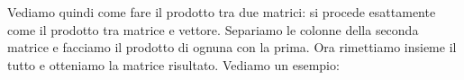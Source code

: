 \documentclass{article}     %
\begin{document}
Vediamo quindi come fare il prodotto tra due matrici: si procede esattamente come il prodotto tra matrice e vettore. Separiamo le colonne della seconda matrice e facciamo il prodotto di ognuna con la prima. Ora rimettiamo insieme il tutto e otteniamo la matrice risultato. Vediamo un esempio:
    \grid[5.9cm]{}

\end{ex}
\end{document}
